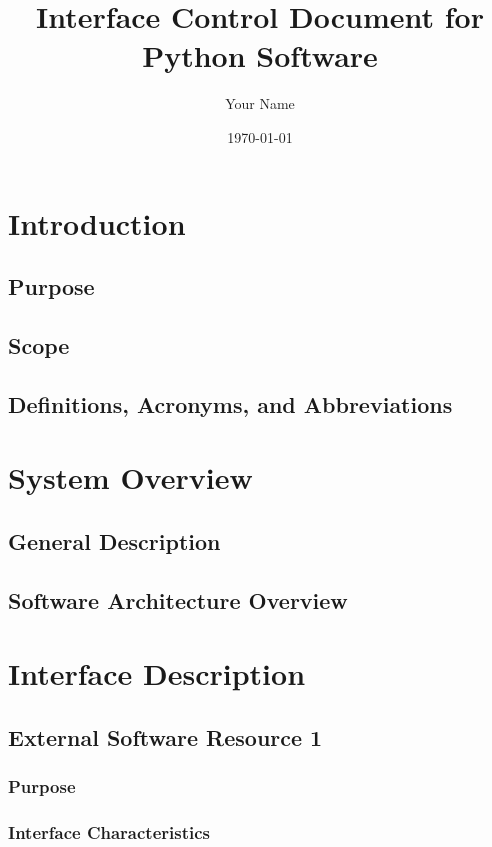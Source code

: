 \documentclass[11pt,a4paper,ngerman]{article}
\begin{document}
\title{Interface Control Document for Python Software}
\author{Your Name}
\date{\today}

\maketitle
\newpage

\tableofcontents
\newpage

\section{Introduction}
\subsection{Purpose}
\subsection{Scope}
\subsection{Definitions, Acronyms, and Abbreviations}

\section{System Overview}
\subsection{General Description}
\subsection{Software Architecture Overview}

\section{Interface Description}
\subsection{External Software Resource 1}
\subsubsection{Purpose}
\subsubsection{Interface Characteristics}
\end{document}
